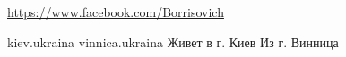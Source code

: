  
 
 
 
 

\url{https://www.facebook.com/Borrisovich}\par
kiev.ukraina
vinnica.ukraina
Живет в г. Киев
Из г. Винница

